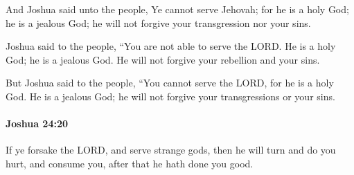 			\begin{versebox}
					\item[BHS] 
					\item[ASV] And Joshua said unto the people, Ye cannot serve Jehovah; for he is a holy God; he is a jealous God; he will not forgive your transgression nor your sins.
					\item[NIV] Joshua said to the people, “You are not able to serve the LORD. He is a holy God; he is a jealous God. He will not forgive your rebellion and your sins.
					\item[NRSV] But Joshua said to the people, “You cannot serve the LORD, for he is a holy God. He is a jealous God; he will not forgive your transgressions or your sins.
			\end{versebox}

		\paragraph{Joshua 24:20} %
			\label{JOSHUA-24-20}

			If ye forsake the LORD, and serve strange gods, then he will turn and do you hurt, and consume you, after that he hath done you good.

